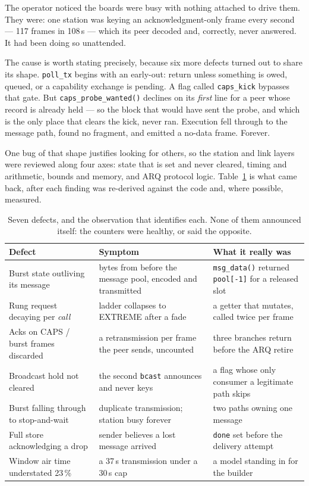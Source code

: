 The operator noticed the boards were busy with nothing attached to
drive them.  They were: one station was keying an acknowledgment-only
frame every second --- 117 frames in 108\,s --- which its peer decoded
and, correctly, never answered.  It had been doing so unattended.

The cause is worth stating precisely, because six more defects turned
out to share its shape.  \texttt{poll\_tx} begins with an early-out:
return unless something is owed, queued, or a capability exchange is
pending.  A flag called \texttt{caps\_kick} bypasses that gate.  But
\texttt{caps\_probe\_wanted()} declines on its \emph{first} line for a
peer whose record is already held --- so the block that would have sent
the probe, and which is the only place that clears the kick, never ran.
Execution fell through to the message path, found no fragment, and
emitted a no-data frame.  Forever.

One bug of that shape justifies looking for others, so the station and
link layers were reviewed along four axes: state that is set and never
cleared, timing and arithmetic, bounds and memory, and ARQ protocol
logic.  Table~\ref{tab:review} is what came back, after each finding was
re-derived against the code and, where possible, measured.

\begin{table}[H]
    \centering
    \caption{Seven defects, and the observation that identifies each.
             None of them announced itself: the counters were healthy,
             or said the opposite.}
    \label{tab:review}
    \small
    \begin{tabular}{@{}p{4.5cm}p{4.3cm}p{4.6cm}@{}}
    \toprule
    \textbf{Defect} & \textbf{Symptom} & \textbf{What it really was} \\
    \midrule
    Burst state outliving its message &
    bytes from before the message pool, encoded and transmitted &
    \texttt{msg\_data()} returned \texttt{pool[-1]} for a released slot \\
    Rung request decaying per \emph{call} &
    ladder collapses to EXTREME after a fade &
    a getter that mutates, called twice per frame \\
    Acks on CAPS / burst frames discarded &
    a retransmission per frame the peer sends, uncounted &
    three branches return before the ARQ retire \\
    Broadcast hold not cleared &
    the second \texttt{bcast} announces and never keys &
    a flag whose only consumer a legitimate path skips \\
    Burst falling through to stop-and-wait &
    duplicate transmission; station busy forever &
    two paths owning one message \\
    Full store acknowledging a drop &
    sender believes a lost message arrived &
    \texttt{done} set before the delivery attempt \\
    Window air time understated 23\,\% &
    a 37\,s transmission under a 30\,s cap &
    a model standing in for the builder \\
    \bottomrule
    \end{tabular}
\end{table}

